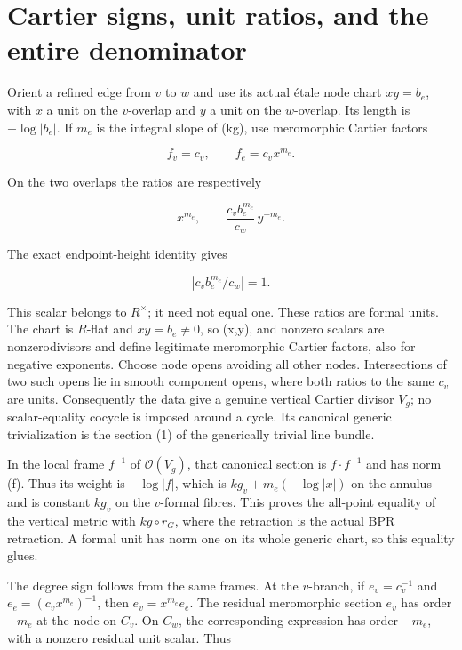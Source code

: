 \documentclass[
  11pt,
]{article}
\begin{document}
\section{Cartier signs, unit ratios, and the entire
denominator}\label{cartier-signs-unit-ratios-and-the-entire-denominator}

Orient a refined edge from \(v\) to \(w\) and use its actual étale node
chart \(xy=b_e\), with \(x\) a unit on the \(v\)-overlap and \(y\) a
unit on the \(w\)-overlap. Its length is \(-\log|b_e|\). If \(m_e\) is
the integral slope of (kg), use meromorphic Cartier factors

\[
 f_v=c_v,\qquad f_e=c_vx^{m_e}.
\]

On the two overlaps the ratios are respectively

\[
 x^{m_e},\qquad
 \frac{c_vb_e^{m_e}}{c_w}\,y^{-m_e}.
\]

The exact endpoint-height identity gives

\[
 \left|c_vb_e^{m_e}/c_w\right|=1.
\]

This scalar belongs to \(R^\times\); it need not equal one. These ratios
are formal units. The chart is \(R\)-flat and \(xy=b_e\ne0\), so (x,y),
and nonzero scalars are nonzerodivisors and define legitimate
meromorphic Cartier factors, also for negative exponents. Choose node
opens avoiding all other nodes. Intersections of two such opens lie in
smooth component opens, where both ratios to the same \(c_v\) are units.
Consequently the data give a genuine vertical Cartier divisor \(V_g\);
no scalar-equality cocycle is imposed around a cycle. Its canonical
generic trivialization is the section (1) of the generically trivial
line bundle.

In the local frame \(f^{-1}\) of \(\mathcal O(V_g)\), that canonical
section is \(f\cdot f^{-1}\) and has norm (\textbar f\textbar). Thus its
weight is \(-\log|f|\), which is \(kg_v+m_e(-\log|x|)\) on the annulus
and is constant \(kg_v\) on the \(v\)-formal fibres. This proves the
all-point equality of the vertical metric with \(kg\circ r_G\), where
the retraction is the actual BPR retraction. A formal unit has norm one
on its whole generic chart, so this equality glues.

The degree sign follows from the same frames. At the \(v\)-branch, if
\(e_v=c_v^{-1}\) and \(e_e=(c_vx^{m_e})^{-1}\), then \(e_v=x^{m_e}e_e\).
The residual meromorphic section \(e_v\) has order \(+m_e\) at the node
on \(C_v\). On \(C_w\), the corresponding expression has order \(-m_e\),
with a nonzero residual unit scalar. Thus
\end{document}
